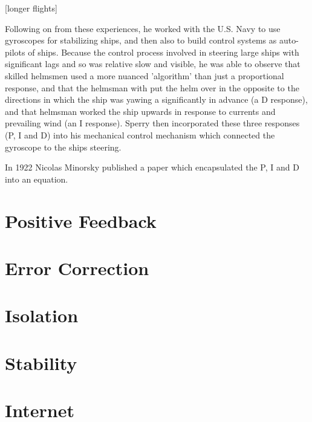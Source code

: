 [longer flights]
 
Following on from these experiences, he worked with the U.S. Navy to use gyroscopes for stabilizing
ships, and then also to build control systems as auto-pilots of ships. Because the control process
involved in steering large ships with significant lags and so was relative slow and visible, he was
able to observe that skilled helmsmen used a more nuanced 'algorithm' than just a proportional
response, and that the helmsman with put the helm over in the opposite to the directions in which
the ship was yawing a significantly in advance (a D response), and that helmsman worked the ship
upwards in response to currents and prevailing wind (an I response). Sperry then incorporated these
three responses (P, I and D) into his mechanical control mechanism which connected the gyroscope to
the ships steering.

In 1922 Nicolas Minorsky published a paper which encapsulated the P, I and D into an
equation.\cite{minorsky1922}

\section{Positive Feedback}

\section{Error Correction}

\section{Isolation}

\section{Stability}

\section{Internet}

